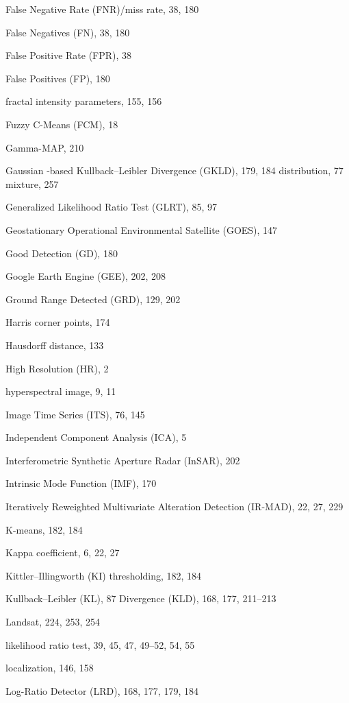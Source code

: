 \documentclass[fleqn,treatise,allpages]{ISTE_Science}
\begin{document}
\begin{theindex}
    \item False Negative Rate (FNR)/miss rate, 38, 180
  \item False Negatives (FN), 38, 180
  \item False Positive Rate (FPR), 38
  \item False Positives (FP), 180
  \item fractal intensity parameters, 155, 156
  \item Fuzzy C-Means (FCM), 18
  \item Gamma-MAP, 210
  \item Gaussian
    \subitem -based Kullback--Leibler Divergence (GKLD), 179, 184
    \subitem distribution, 77
    \subitem mixture, 257
  \item Generalized Likelihood Ratio Test (GLRT), 85, 97
  \item Geostationary Operational Environmental Satellite (GOES), 147
  \item Good Detection (GD), 180
  \item Google Earth Engine (GEE), 202, 208
  \item Ground Range Detected (GRD), 129, 202
  \item Harris corner points, 174
  \item Hausdorff distance, 133
  \item High Resolution (HR), 2
  \item hyperspectral image, 9, 11
  \item Image Time Series (ITS), 76, 145
  \item Independent Component Analysis (ICA), 5
  \item Interferometric Synthetic Aperture Radar (InSAR), 202
  \item Intrinsic Mode Function (IMF), 170
  \item Iteratively Reweighted Multivariate Alteration Detection (IR-MAD),
		22, 27, 229
  \item K-means, 182, 184
  \item Kappa coefficient, 6, 22, 27
  \item Kittler--Illingworth (KI) thresholding, 182, 184
  \item Kullback--Leibler (KL), 87
  \subitem Divergence (KLD), 168, 177, 211--213
    \item Landsat, 224, 253, 254
  \item likelihood ratio test, 39, 45, 47, 49--52, 54, 55
  \item localization, 146, 158
  \item Log-Ratio Detector (LRD), 168, 177, 179, 184

\end{theindex}
\end{document}
